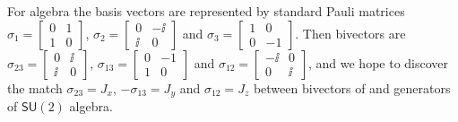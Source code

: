 \begin{example}
\begin{example}
For  algebra the basis  vectors are represented by
standard Pauli matrices $\sigma_1=
\begin{bmatrix}0&1\\1&0\end{bmatrix}$, $\sigma_2=
\begin{bmatrix}0&-\ii\\ \ii&0\end{bmatrix}$ and $\sigma_3=
\begin{bmatrix}1&0\\ 0&-1\end{bmatrix}$. Then bivectors are
$\sigma_{23}= \begin{bmatrix}0&\ii\\\ii&0\end{bmatrix}$,
$\sigma_{13}= \begin{bmatrix}0&-1\\1&0\end{bmatrix}$ and
$\sigma_{12}= \begin{bmatrix}-\ii&0\\ 0&\ii\end{bmatrix}$, and we
hope to discover the match $\sigma_{23}=J_x$, $-\sigma_{13}=J_y$
and  $\sigma_{12}=J_z$ between bivectors of   and
generators of $\mathsf{SU}(2)$ algebra.


\end{example}
\end{example}

